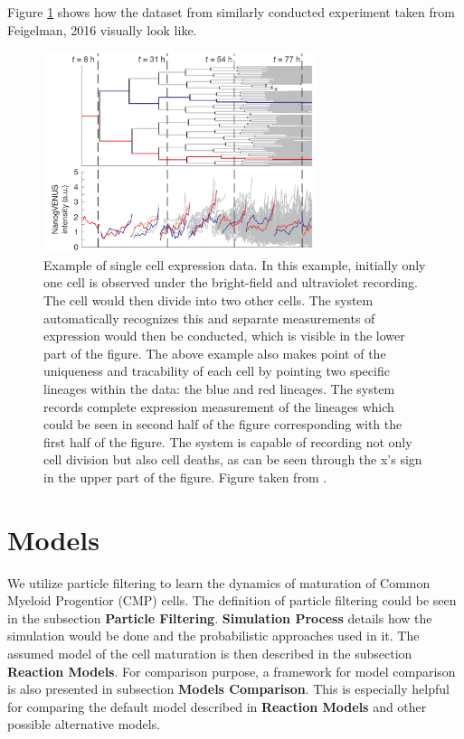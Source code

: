 \documentclass{bioinfo}
\begin{document}
Figure \ref{fig:02} shows how the dataset from similarly conducted experiment taken from Feigelman, 2016 \citep{Feigelman16} visually look like.

\begin{figure}[h]
\includegraphics[width=8cm]{figures/cell-generations.png}
\caption{Example of single cell expression data. In this example, initially only one cell is observed under the bright-field and ultraviolet recording. The cell would then divide into two other cells. The system automatically recognizes this and separate measurements of expression would then be conducted, which is visible in the lower part of the figure. The above example also makes point of the uniqueness and tracability of each cell by pointing two specific lineages within the data: the blue and red lineages. The system records complete expression measurement of the lineages which could be seen in second half of the figure corresponding with the first half of the figure. The system is capable of recording not only cell division but also cell deaths, as can be seen through the x's sign in the upper part of the figure. Figure taken from \citealp{Feigelman16}.}\label{fig:02}
\end{figure}

\section{Models}

We utilize particle filtering to learn the dynamics of maturation of Common Myeloid Progentior (CMP) cells. The definition of particle filtering could be seen in the subsection \textbf{Particle Filtering}. \textbf{Simulation Process} details how the simulation would be done and the probabilistic approaches used in it. The assumed model of the cell maturation is then described in the subsection \textbf{Reaction Models}. For comparison purpose, a framework for model comparison is also presented in subsection \textbf{Models Comparison}. This is especially helpful for comparing the default model described in \textbf{Reaction Models} and other possible alternative models.
\end{document}
